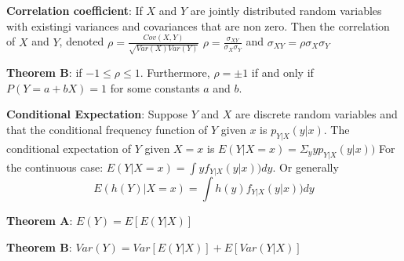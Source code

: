 \documentclass{article}
\begin{document}
\begin{multicols*}{2}
    \textbf{Correlation coefficient}: If $X$ and $Y$ are jointly distributed random variables with existingi variances and covariances that are non zero.
    Then the correlation of $X$ and $Y$, denoted $\rho = \frac{Cov(X, Y)}{\sqrt{Var(X) Var(Y)}}$
    $\rho = \frac{\sigma_{XY}}{\sigma_X \sigma_Y}$
    and $\sigma_{XY} = \rho \sigma_X \sigma_Y$

    \textbf{Theorem B}: if $-1 \leq \rho \leq 1$. Furthermore, $\rho = \pm 1$ if and only if $P(Y = a + bX) = 1$ for some constants $a$ and $b$.

    \textbf{Conditional Expectation}:
    Suppose $Y$ and $X$ are discrete random variables and that the conditional frequency function of $Y$ given $x$
    is $p_{Y|X}(y|x)$. The conditional expectation of $Y$ given $X=x$ is $E(Y |X=x) = \Sigma_y y p_{Y|X}(y|x))$
    For the continuous case: $E(Y |X=x) = \int y f_{Y|X}(y|x)) dy$. Or generally
    \[
        E(h(Y) |X=x) = \int h(y) f_{Y|X}(y|x)) dy
    \]

    \textbf{Theorem A}: $E(Y) = E \left[ E(Y|X) \right]$

    \textbf{Theorem B}: $Var(Y) = Var\left[ E(Y|X) \right] + E\left[ Var(Y|X) \right]$

\end{multicols*}
\end{document}
